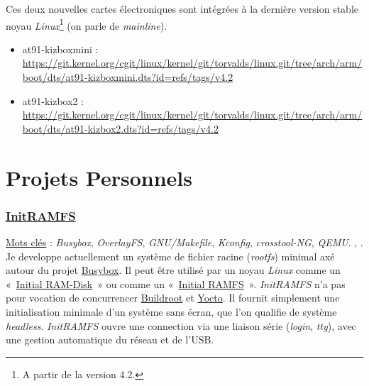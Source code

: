 \documentclass[a4paper]{article}
\begin{document}
Ces deux nouvelles cartes électroniques sont intégrées à la dernière version stable noyau \textit{Linux}\footnote{A partir de la version 4.2.} (on parle de \textit{mainline}).
\begin{itemize}
\item at91-kizboxmini : \url{https://git.kernel.org/cgit/linux/kernel/git/torvalds/linux.git/tree/arch/arm/boot/dts/at91-kizboxmini.dts?id=refs/tags/v4.2}
\item at91-kizbox2 : \url{https://git.kernel.org/cgit/linux/kernel/git/torvalds/linux.git/tree/arch/arm/boot/dts/at91-kizbox2.dts?id=refs/tags/v4.2}
\end{itemize}
\clearpage

\part{Projets Personnels}

\section{\href{https://github.com/gazoo74/initramfs/}{InitRAMFS}}

\underline{Mots clés} : \textit{Busybox}, \textit{OverlayFS}, \textit{GNU/Makefile}, \textit{Kconfig}, \textit{crosstool-NG}, \textit{QEMU}. , \textit{}.\\

Je developpe actuellement un système de fichier racine (\textit{rootfs}) minimal axé autour du projet \href{http://www.busybox.net/}{Busybox}. Il peut être utilisé par un noyau \textit{Linux} comme un «~\href{https://www.kernel.org/doc/Documentation/initrd.txt}{Initial RAM-Disk}~» ou comme un «~\href{https://www.kernel.org/doc/Documentation/filesystems/ramfs-rootfs-initramfs.txt}{Initial RAMFS}~». \textit{InitRAMFS} n'a pas pour vocation de concurrencer \href{http://buildroot.org/}{Buildroot} et \href{https://www.yoctoproject.org/}{Yocto}. Il fournit simplement une initialisation minimale d'un système sans écran, que l'on qualifie de système \textit{headless}. \textit{InitRAMFS} ouvre une connection via une liaison série (\textit{login}, \textit{tty}), avec une gestion automatique du réseau et de l'USB.\\
\end{document}
